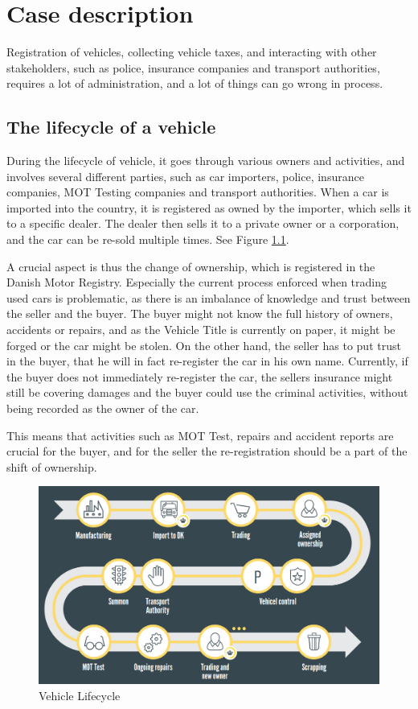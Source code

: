 \documentclass[oneside,a4paper,10pts,article]{memoir}
\begin{document}
\chapter{Case description}
\label{sec:case}
Registration of vehicles, collecting vehicle taxes, and interacting
with other stakeholders, such as police, insurance companies and
transport authorities, requires a lot of administration, and a lot of
things can go wrong in process.

\section{The lifecycle of a vehicle}
During the lifecycle of vehicle, it goes through various owners and
activities, and involves several different parties, such as car
importers, police, insurance companies, MOT Testing companies and
transport authorities. When a car is imported into the country, it is
registered as owned by the importer, which sells it to a specific
dealer. The dealer then sells it to a private owner or a corporation,
and the car can be re-sold multiple times. See Figure \ref{fig:lifecycle}.

A crucial aspect is thus the change of ownership, which is registered
in the Danish Motor Registry. Especially the current process enforced
when trading used cars is problematic, as there is an imbalance of
knowledge and trust between the seller and the buyer. The buyer might
not know the full history of owners, accidents or repairs, and as the
Vehicle Title is currently on paper, it might be forged or the car
might be stolen. On the other hand, the seller has to put trust in the
buyer, that he will in fact re-register the car in his own
name. Currently, if the buyer does not immediately re-register the
car, the sellers insurance might still be covering damages and the
buyer could use the criminal activities, without being recorded as the
owner of the car.

This means that activities such as MOT Test, repairs and accident
reports are crucial for the buyer, and for the seller the
re-registration should be a part of the shift of ownership.

\begin{figure}
  \centering
  \includegraphics[width=\textwidth]{lifecycle.png}
  \caption{Vehicle Lifecycle}
  \label{fig:lifecycle}
\end{figure}
\end{document}
